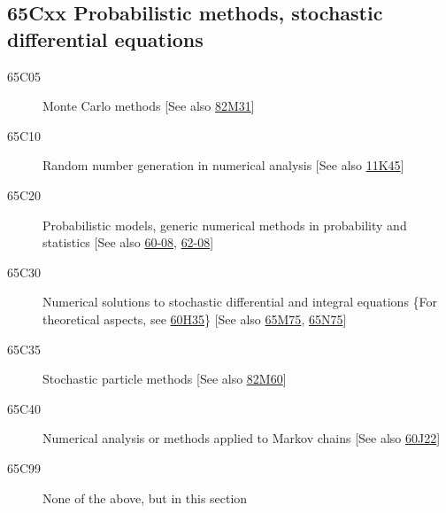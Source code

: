 \documentclass[letterpaper]{article}
\begin{document}
\subsection*{65Cxx  Probabilistic methods, stochastic differential equations }\label{65Cxx}
\begin{description}  
\item [65C05]\label{65C05} Monte Carlo methods [See also \hyperref[82M31]{82M31}]
\item [65C10]\label{65C10} Random number generation in numerical analysis [See also \hyperref[11K45]{11K45}]
\item [65C20]\label{65C20} Probabilistic models, generic numerical methods in probability and statistics [See also \hyperref[60-08]{60-08}, \hyperref[62-08]{62-08}]
\item [65C30]\label{65C30} Numerical solutions to stochastic differential and integral equations \{For theoretical aspects, see \hyperref[60H35]{60H35}\} [See also \hyperref[65M75]{65M75}, \hyperref[65N75]{65N75}]
\item [65C35]\label{65C35} Stochastic particle methods [See also \hyperref[82M60]{82M60}]
\item [65C40]\label{65C40} Numerical analysis or methods applied to Markov chains [See also \hyperref[60J22]{60J22}]
\item [65C99]\label{65C99} None of the above, but in this section
\end{description}
\end{document}
